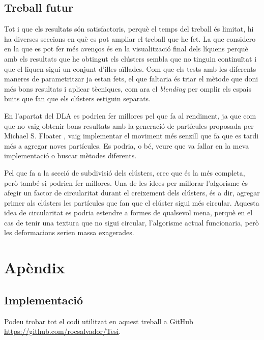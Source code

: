 \documentclass{article}
\begin{document}
\subsection{Treball futur}

Tot i que els resultats són satisfactoris, perquè el temps del treball és limitat, hi ha diverses seccions en què es pot ampliar el treball que he fet. La que considero en la que es pot fer més avenços és en la visualització final dels líquens perquè amb els resultats que he obtingut els clústers sembla que no tinguin continuïtat i que el liquen sigui un conjunt d'illes aïllades. Com que els tests amb les diferents maneres de parametritzar ja estan fets, el que faltaria és triar el mètode que doni més bons resultats i aplicar tècniques, com ara el \textit{blending} per omplir els espais buits que fan que els clústers estiguin separats.

En l'apartat del DLA es podrien fer millores pel que fa al rendiment, ja que com que no vaig obtenir bons resultats amb la generació de partícules proposada per Michael S. Floater \cite{FLOATER200319}, vaig implementar el moviment més senzill que fa que es tardi més a agregar noves partícules. Es podria, o bé, veure que va fallar en la meva implementació o buscar mètodes diferents.

Pel que fa a la secció de subdivisió dels clústers, crec que és la més completa, però també si podrien fer millores. Una de les idees per millorar l'algorisme és afegir un factor de circularitat durant el creixement dels clústers, és a dir, agregar primer als clústers les partícules que fan que el clúster sigui més circular. Aquesta idea de circularitat es podria estendre a formes de qualsevol mena, perquè en el cas de tenir una textura que no sigui circular, l'algorisme actual funcionaria, però les deformacions serien massa exagerades.

\newpage






\newpage

\section{Apèndix}

\subsection{Implementació}

Podeu trobar tot el codi utilitzat en aquest treball a GitHub \url{https://github.com/rocsalvador/Tesi}.
\end{document}
